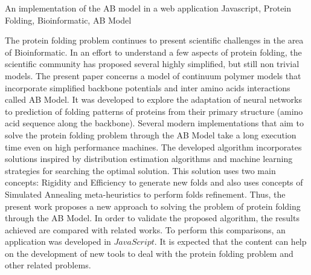 \documentclass[dm,ppgcomp]{texfurg}
\begin{document}
\begin{englishabstract}
{An implementation of the AB model in a web application}
{Javascript, Protein Folding, Bioinformatic, AB Model}

The protein folding problem continues to present scientific challenges in the area of Bioinformatic. In an effort to understand a few aspects of protein folding, the scientific community has proposed several highly simplified, but still non trivial models. 
The present paper concerns a model of continuum polymer models that incorporate simplified backbone potentials and inter amino acids interactions called AB Model. It was developed to explore the adaptation of neural networks to prediction of folding patterns of proteins from their primary structure (amino acid sequence along the backbone). Several modern implementations that aim to solve the protein folding problem through the AB Model take a long execution time even on high performance machines.  
The developed algorithm incorporates solutions inspired by distribution estimation algorithms and machine learning strategies for searching the optimal solution. This solution uses two main concepts: Rigidity and Efficiency to generate new folds and also uses concepts of Simulated Annealing meta-heuristics to perform folds refinement.
Thus, the present work proposes a new approach to solving the problem of protein folding through the AB Model. In order to validate the proposed algorithm, the results achieved are compared with related works. To perform this comparisons, an application was developed in $JavaScript$. It is expected that the content can help on the development of new tools to deal with the protein folding problem and other related problems.

\end{englishabstract}

\listoffigures

\listoftables
\end{document}
